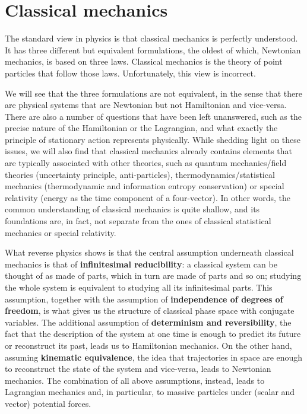 \chapter{Classical mechanics}

The standard view in physics is that classical mechanics is perfectly understood. It has three different but equivalent formulations, the oldest of which, Newtonian mechanics, is based on three laws. Classical mechanics is the theory of point particles that follow those laws. Unfortunately, this view is incorrect.

We will see that the three formulations are not equivalent, in the sense that there are physical systems that are Newtonian but not Hamiltonian and vice-versa. There are also a number of questions that have been left unanswered, such as the precise nature of the Hamiltonian or the Lagrangian, and what exactly the principle of stationary action represents physically. While shedding light on these issues, we will also find that classical mechanics already contains elements that are typically associated with other theories, such as quantum mechanics/field theories (uncertainty principle, anti-particles), thermodynamics/statistical mechanics (thermodynamic and information entropy conservation) or special relativity (energy as the time component of a four-vector). In other words, the common understanding of classical mechanics is quite shallow, and its foundations are, in fact, not separate from the ones of classical statistical mechanics or special relativity.

What reverse physics shows is that the central assumption underneath classical mechanics is that of \textbf{infinitesimal reducibility}: a classical system can be thought of as made of parts, which in turn are made of parts and so on; studying the whole system is equivalent to studying all its infinitesimal parts. This assumption, together with the assumption of \textbf{independence of degrees of freedom}, is what gives us the structure of classical phase space with conjugate variables. The additional assumption of \textbf{determinism and reversibility}, the fact that the description of the system at one time is enough to predict its future or reconstruct its past, leads us to Hamiltonian mechanics. On the other hand, assuming \textbf{kinematic equivalence}, the idea that trajectories in space are enough to reconstruct the state of the system and vice-versa, leads to Newtonian mechanics. The combination of all above assumptions, instead, leads to Lagrangian mechanics and, in particular, to massive particles under (scalar and vector) potential forces.

